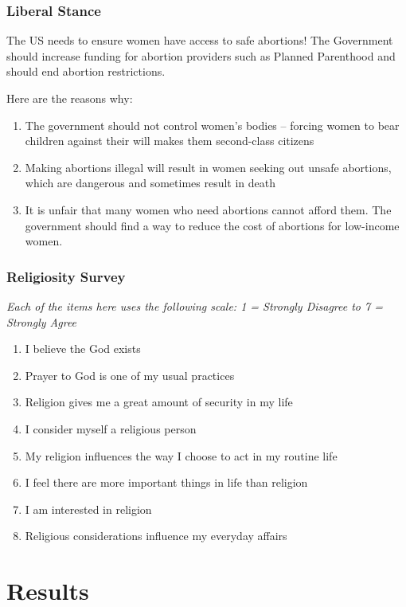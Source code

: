 \documentclass[14pt]{beamer}
\newcommand\e{\emph}
\begin{document}
\begin{frame}
\frametitle{Liberal Stance}
\small
The US needs to ensure women have access to safe abortions! The Government should increase funding for abortion providers such as Planned Parenthood and should end abortion restrictions.

Here are the reasons why:
\begin{enumerate}
	\item  The government should not control women’s bodies – forcing women to bear children against their will makes them second-class citizens
	\item Making abortions illegal will result in women seeking out unsafe abortions, which are dangerous and sometimes result in death
	\item It is unfair that many women who need abortions cannot afford them. The government should find a way to reduce the cost of abortions for low-income women.
\end{enumerate}
\end{frame}

\begin{frame}
\frametitle{Religiosity Survey}
\footnotesize
\begin{center}
	\e{Each of the items here uses the following scale: 1 = Strongly Disagree to 7 = Strongly Agree}
\end{center}

\begin{enumerate}
	\item I believe the God exists
	\item Prayer to God is one of my usual practices
	\item Religion gives me a great amount of security in my life
	\item I consider myself a religious person
	\item My religion influences the way I choose to act in my routine life
	\item I feel there are more important things in life than religion
	\item I am interested in religion 
	\item Religious considerations influence my everyday affairs
\end{enumerate}
\end{frame}

\section{Results}
\end{document}

